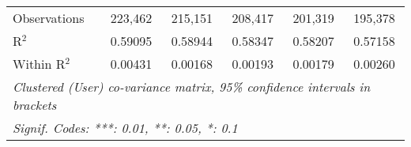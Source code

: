 \begin{table}[htbp]
\begin{threeparttable}[b]
\begin{tabular}{lccccc}
         Observations             & 223,462          & 215,151          & 208,417          & 201,319          & 195,378\\  
         R$^2$                    & 0.59095          & 0.58944          & 0.58347          & 0.58207          & 0.57158\\  
         Within R$^2$             & 0.00431          & 0.00168          & 0.00193          & 0.00179          & 0.00260\\  
         \midrule \midrule
         \multicolumn{6}{l}{\emph{Clustered (User) co-variance matrix, 95\% confidence intervals in brackets}}\\
         \multicolumn{6}{l}{\emph{Signif. Codes: ***: 0.01, **: 0.05, *: 0.1}}\\
      \end{tabular}
   \end{threeparttable}
\end{table}


